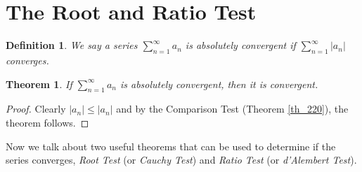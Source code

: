\documentclass[11pt]{book}
\newtheorem{definition}{Definition}[chapter]
\newtheorem{theorem}{Theorem}[chapter]
\theoremstyle{definition}
\numberwithin{equation}{chapter}
\begin{document}
\medskip



\section{The Root and Ratio Test}

\begin{definition}
We say a series $\sum^\infty_{n=1} a_n$ is absolutely convergent if $\sum^\infty_{n=1} \left|a_n\right|$ converges.
\end{definition}

\medskip

\begin{theorem}
If $\sum^\infty_{n=1} a_n$ is absolutely convergent, then it is convergent.
\end{theorem}
\begin{proof}
Clearly $\left|a_n\right| \leq \left|a_n\right|$ and by the Comparison Test (Theorem \ref{th_220}), the theorem follows.
\end{proof}

\medskip

Now we talk about two useful theorems that can be used to determine if the series converges, {\em Root Test} (or {\em Cauchy Test}) and {\em Ratio Test} (or {\em d'Alembert Test}).

\medskip
\end{document}
